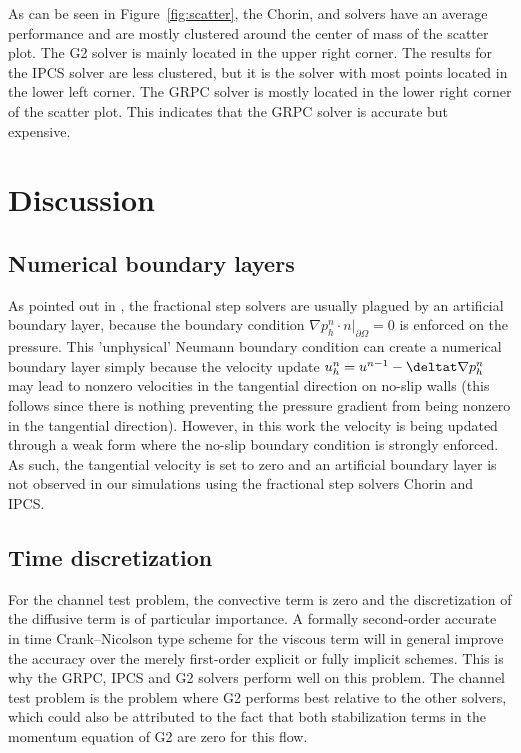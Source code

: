 As can be seen in Figure~\ref{fig:scatter}, the Chorin,  and
 solvers have an average performance and are mostly clustered
around the center of mass of the scatter plot. The G2 solver is mainly
located in the upper right corner. The results for the IPCS solver are
less clustered, but it is the solver with most points located in the
lower left corner. The GRPC solver is mostly located in the lower
right corner of the scatter plot. This indicates that the GRPC solver
is accurate but expensive.

\section{Discussion}
\label{Discussion}

\subsection{Numerical boundary layers}

As pointed out in \citet{GuermondMinevShen2006}, the fractional step
solvers are usually plagued by an artificial boundary layer, because
the boundary condition $ \nabla p^n_h \cdot n |_{\partial\Omega}=0$ is
enforced on the pressure. This 'unphysical' Neumann boundary condition
can create a numerical boundary layer simply because the velocity
update $u^{n}_h=u^{n-1}-\deltat\nabla p^n_h$ may lead to nonzero
velocities in the tangential direction on no-slip walls (this follows
since there is nothing preventing the pressure gradient from being
nonzero in the tangential direction). However, in this work the
velocity is being updated through a weak form where the no-slip
boundary condition is strongly enforced. As such, the tangential
velocity is set to zero and an artificial boundary layer is not
observed in our simulations using the fractional step solvers Chorin
and IPCS.

\subsection{Time discretization}

For the channel test problem, the convective term is zero and the
discretization of the diffusive term is of particular importance. A
formally second-order accurate in time Crank--Nicolson type scheme for
the viscous term will in general improve the accuracy over the merely
first-order explicit or fully implicit schemes. This is why the GRPC,
IPCS and G2 solvers perform well on this problem. The channel test
problem is the problem where G2 performs best relative to the other
solvers, which could also be attributed to the fact that both
stabilization terms in the momentum equation of G2 are zero for this
flow.

